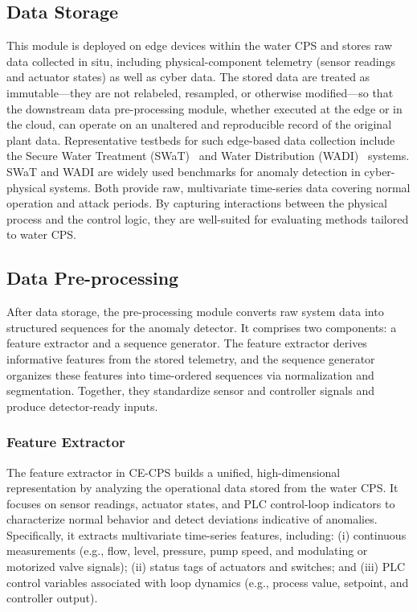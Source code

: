 \documentclass[pdflatex,sn-mathphys-num]{sn-jnl}%
\theoremstyle{thmstyleone}
\theoremstyle{thmstyletwo}%
\theoremstyle{thmstylethree}%
\begin{document}
\subsection{Data Storage}
This module is deployed on edge devices within the water CPS and stores raw data collected in situ, including physical-component telemetry (sensor readings and actuator states) as well as cyber data. The stored data are treated as immutable---they are not relabeled, resampled, or otherwise modified---so that the downstream data pre-processing module, whether executed at the edge or in the cloud, can operate on an unaltered and reproducible record of the original plant data. Representative testbeds for such edge-based data collection include the Secure Water Treatment (SWaT)~\cite{mathur2016swat} and Water Distribution (WADI)~\cite{ahmed2017wadi} systems.
SWaT and WADI are widely used benchmarks for anomaly detection in cyber-physical systems. Both provide raw, multivariate time-series data covering normal operation and attack periods. By capturing interactions between the physical process and the control logic, they are well-suited for evaluating methods tailored to water CPS.


\subsection{Data Pre-processing}
After data storage, the pre-processing module converts raw system data into structured sequences for the anomaly detector. It comprises two components: a feature extractor and a sequence generator. The feature extractor derives informative features from the stored telemetry, and the sequence generator organizes these features into time-ordered sequences via normalization and segmentation. Together, they standardize sensor and controller signals and produce detector-ready inputs.

\subsubsection{Feature Extractor}
The feature extractor in CE-CPS builds a unified, high-dimensional representation by analyzing the operational data stored from the water CPS. It focuses on sensor readings, actuator states, and PLC control-loop indicators to characterize normal behavior and detect deviations indicative of anomalies. Specifically, it extracts multivariate time-series features, including: (i) continuous measurements (e.g., flow, level, pressure, pump speed, and modulating or motorized valve signals); (ii) status tags of actuators and switches; and (iii) PLC control variables associated with loop dynamics (e.g., process value, setpoint, and controller output).
\end{document}
